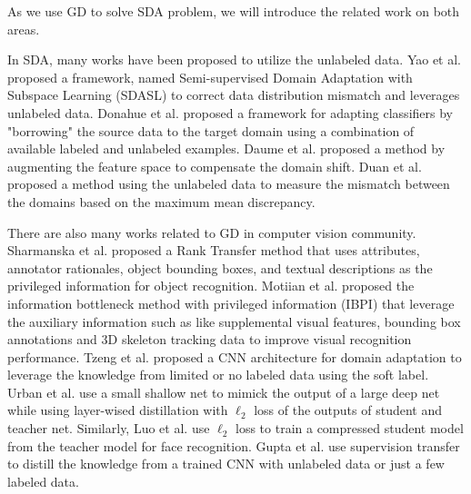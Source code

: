 As we use GD to solve SDA problem, we will introduce the related work on both areas.

In SDA, many works have been proposed to utilize the unlabeled data. Yao {et al.} \cite{yao2015semi} proposed a framework, named Semi-supervised Domain Adaptation with Subspace Learning (SDASL) to correct data distribution mismatch and leverages unlabeled data. Donahue {et al.}\cite{Donahue_2013_CVPR} proposed a framework for adapting classifiers by "borrowing" the source data to the target domain using a combination of available labeled and unlabeled examples. Daume {et al.} \cite{daume2010frustratingly} proposed a method by augmenting the feature space to compensate the domain shift. Duan {et al.} \cite{duan2012visual} proposed a method using the unlabeled data to measure the mismatch between the domains based on the maximum mean discrepancy.

There are also many works related to GD in computer vision community. Sharmanska et al. \cite{Sharmanska_2013_ICCV} proposed a Rank Transfer method that uses attributes, annotator
rationales, object bounding boxes, and textual descriptions as the privileged information for object recognition. Motiian et al. \cite{Motiian_2016_CVPR} proposed {the information bottleneck method with privileged information (IBPI)} that leverage the auxiliary information such as like supplemental visual features, bounding box annotations and 3D skeleton tracking data to improve visual recognition performance. Tzeng et al. \cite{Tzeng_2015_ICCV} proposed a CNN architecture for domain adaptation to leverage the knowledge from limited or no labeled data using the soft label. Urban et al. \cite{urban2016deep} use a small shallow net to mimick the output of a large deep net while using layer-wised distillation with $\ell_2$ loss of the outputs of student and teacher net. Similarly, Luo et al. \cite{luo2016face} use $\ell_2$ loss to train a compressed student model from the teacher model for face recognition. Gupta et al. \cite{Gupta_2016_CVPR} use supervision transfer to distill the knowledge from a trained CNN with unlabeled data or just a few labeled data.